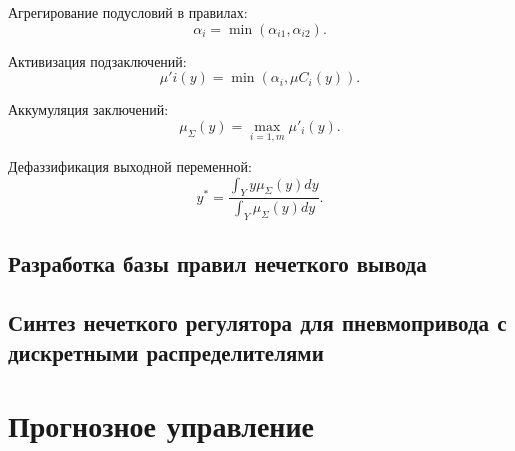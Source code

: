 Агрегирование подусловий в правилах:
\begin{equation*}
\alpha_i = \min(\alpha_{i1}, \alpha_{i2}).
\end{equation*}

Активизация подзаключений:
\begin{equation*}
\mu'i(y) = \min(\alpha_i, \mu{C_i}(y)).
\end{equation*}

Аккумуляция заключений:
\begin{equation*}
\mu_\Sigma(y) = \max_{i=1,m}\mu'_i(y).
\end{equation*}

Дефаззификация выходной переменной:
\begin{equation*}
y^* = \frac{\int_Y y\mu_\Sigma(y)dy}{\int_Y \mu_\Sigma(y)dy}.
\end{equation*}


\subsection{Разработка базы правил нечеткого вывода}\label{subsec:ch3/sec4/sub2}
\subsection{Синтез нечеткого регулятора для пневмопривода с дискретными распределителями}\label{subsec:ch3/sec4/sub2}

\section{Прогнозное управление}\label{sec:ch3/sec5}
